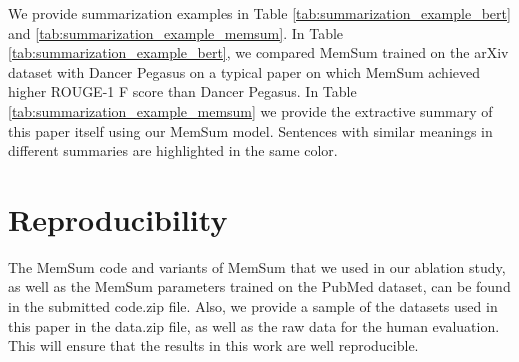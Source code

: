 \documentclass[11pt]{article}
\begin{document}
We provide summarization examples in Table \ref{tab:summarization_example_bert} and \ref{tab:summarization_example_memsum}. In Table \ref{tab:summarization_example_bert}, we compared MemSum trained on the arXiv dataset with Dancer Pegasus \cite{dancerp} on a typical paper on which MemSum achieved higher ROUGE-1 F score than Dancer Pegasus. In Table \ref{tab:summarization_example_memsum} we provide the extractive summary of this paper itself using our MemSum model. Sentences with similar meanings in different summaries are highlighted in the same color.

\section{Reproducibility}
\label{sec:reproduce}
The MemSum code and variants of MemSum that we used in our ablation study, as well as the MemSum parameters trained on the PubMed dataset, can be found in the submitted code.zip file. Also, we provide a sample of the datasets used in this paper in the data.zip file, as well as the raw data for the human evaluation. This will ensure that the results in this work are well reproducible.
\end{document}

